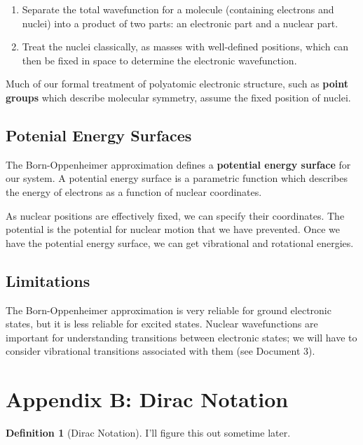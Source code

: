 \documentclass[a4paper]{tufte-handout}
\theoremstyle{definition}
\newtheorem{definition}{Definition}
\begin{document}
\begin{enumerate}
  \item Separate the total wavefunction for a molecule (containing electrons and nuclei) into a product of two parts: an electronic part and a nuclear part.
  \item Treat the nuclei classically, as masses with well-defined positions, which can then be fixed in space to determine the electronic wavefunction.
\end{enumerate}

Much of our formal treatment of polyatomic electronic structure, such as \textbf{point groups}
which describe molecular symmetry, assume the fixed position of nuclei.

\subsection{Potenial Energy Surfaces}

The Born-Oppenheimer approximation defines a \textbf{potential energy surface} for our system.
A potential energy surface is a parametric function which describes the energy of electrons
as a function of nuclear coordinates. 

As nuclear positions are effectively fixed, we can specify their coordinates. The potential is the potential for nuclear motion that we have prevented.
Once we have the potential energy surface, 
we can get vibrational and rotational energies. 

\subsection{Limitations}

The Born-Oppenheimer approximation is very reliable for ground electronic 
states, but it is less reliable for excited states. Nuclear wavefunctions
are important for understanding transitions between electronic states; we will have to consider vibrational transitions associated with them (see Document 3).

\section{Appendix B: Dirac Notation}

\begin{definition}[Dirac Notation]
  I'll figure this out sometime later.
  
\end{definition}



\end{document}
